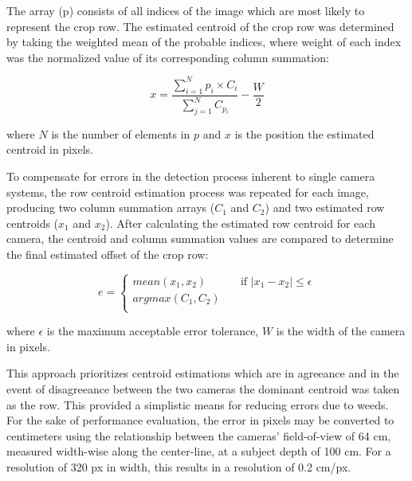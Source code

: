 The array (p) consists of all indices of the image which are most
likely to represent the crop row. The estimated centroid of the crop
row was determined by taking the weighted mean of the probable
indices, where weight of each index was the normalized value of its
corresponding column summation:

\begin{equation}
    x = \frac{\displaystyle\sum_{i=1}^{N} p_{i} \times
      C_{i}}{\displaystyle\sum_{j=1}^{N} C_{p_{i}}} - \frac{W}{2}
  \label{eq:centroid}
\end{equation}
\begin{flushleft}
where $N$ is the number of elements in $p$ and $x$ is the position the
estimated centroid in pixels.
\end{flushleft}

To compensate for errors in the detection process inherent to single
camera systems, the row centroid estimation process was repeated for
each image, producing two column summation arrays ($C_{1}$ and $C_{2}$) and two
estimated row centroids ($x_{1}$ and $x_{2}$). After calculating the estimated
row centroid for each camera, the centroid and column summation values
are compared to determine the final estimated offset of the crop row:

\begin{equation}
  e = 
  \begin{cases}
    mean(x_{1},x_{2})  & \quad \text{if } |x_{1}-x_{2}| \leq  \epsilon\\
    argmax(C_{1},C_{2})  & \quad  \\
  \end{cases}
  \label{eq:camera_selection}
\end{equation}
\begin{flushleft}
where $\epsilon$ is the maximum acceptable error tolerance, $W$ is the width of
the camera in pixels. 
\end{flushleft}

This approach prioritizes centroid estimations which are in agreeance
and in the event of disagreeance between the two cameras the dominant
centroid was taken as the row. This provided a simplistic means for
reducing errors due to weeds. For the sake of performance evaluation,
the error in pixels may be converted to centimeters using the
relationship between the cameras’ field-of-view of 64 cm, measured
width-wise along the center-line, at a subject depth of 100 cm. For a
resolution of 320 px in width, this results in a resolution of 0.2 cm/px.

